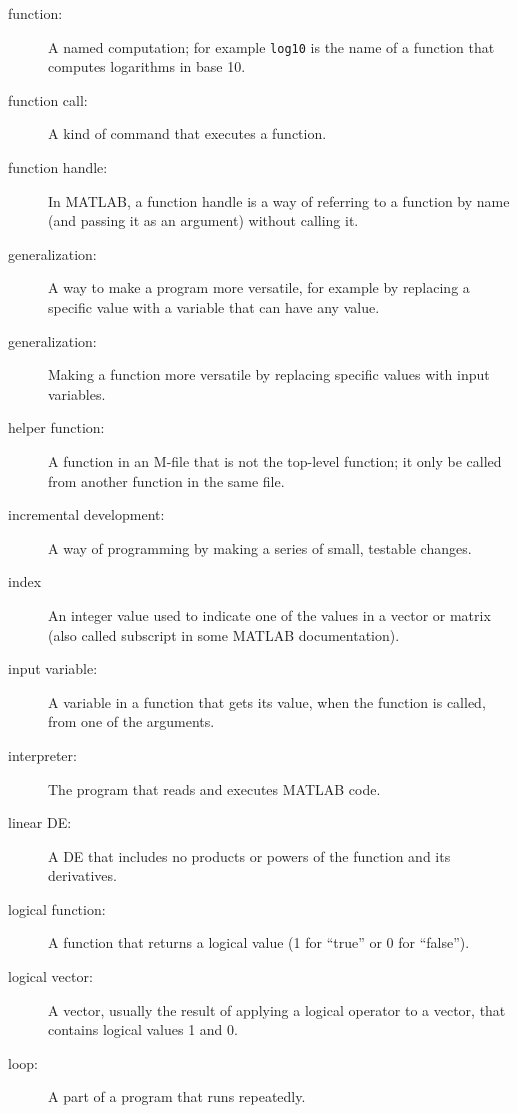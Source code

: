 \begin{description}
\item[function:] A named computation; for example {\tt log10} is the
name of a function that computes logarithms in base 10.

\item[function call:] A kind of command that executes a function.

\item[function handle:] In MATLAB, a function handle is a way of
referring to a function by name (and passing it as an argument)
without calling it.

\item[generalization:] A way to make a program more versatile, for
example by replacing a specific value with a variable that can have
any value.

\item[generalization:] Making a function more versatile by replacing
specific values with input variables.

\item[helper function:] A function in an M-file that is not
the top-level function; it only be called from another function
in the same file.

\item[incremental development:] A way of programming by making a series
of small, testable changes.

\item[index] An integer value used to indicate one of the values
in a vector or matrix (also called subscript in some MATLAB documentation).

\item[input variable:] A variable in a function that gets its value,
when the function is called, from one of the arguments.

\item[interpreter:] The program that reads and executes MATLAB code.

\item[linear DE:] A DE that includes no products or powers of the
function and its derivatives.

\item[logical function:] A function that returns a logical value
(1 for ``true'' or 0 for ``false'').

\item[logical vector:] A vector, usually the result of applying a logical operator to a vector, that contains logical values 1 and 0.

\item[loop:] A part of a program that runs repeatedly.


\end{description}
